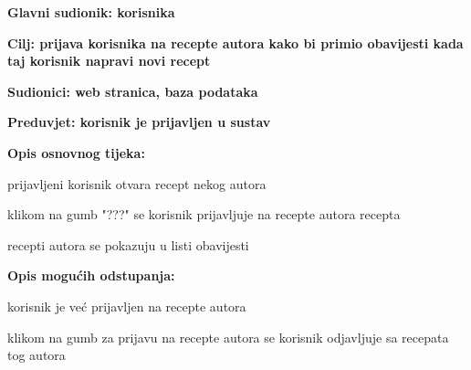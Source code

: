 					\noindent {}
					\begin{packed_item}
						\item \textbf{Glavni sudionik: korisnika}
						\item  \textbf{Cilj: prijava korisnika na recepte autora kako bi primio obavijesti kada taj korisnik napravi novi recept}
						\item  \textbf{Sudionici: web stranica, baza podataka}
						\item  \textbf{Preduvjet: korisnik je prijavljen u sustav}
						
						\item  \textbf{Opis osnovnog tijeka:}
						\item[] \begin{packed_enum}
							\item prijavljeni korisnik otvara recept nekog autora
							\item klikom na gumb "???" se korisnik prijavljuje na recepte autora recepta
							\item recepti autora se pokazuju u listi obavijesti
						\end{packed_enum}
						
						\item  \textbf{Opis mogućih odstupanja:}
						\item[] \begin{packed_item}							
							\item korisnik je već prijavljen na recepte autora
							\begin{packed_enum}
								\item klikom na gumb za prijavu na recepte autora se korisnik odjavljuje sa recepata tog autora
							\end{packed_enum}
						\end{packed_item}
					\end{packed_item}
				
				
				

